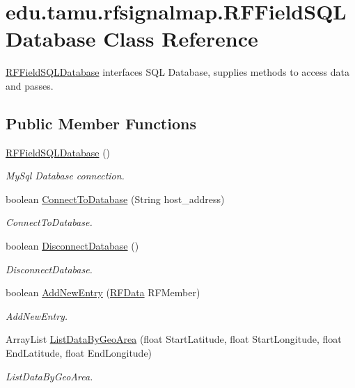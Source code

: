 \hypertarget{classedu_1_1tamu_1_1rfsignalmap_1_1_r_f_field_s_q_l_database}{}\section{edu.\+tamu.\+rfsignalmap.\+R\+F\+Field\+S\+Q\+L\+Database Class Reference}
\label{classedu_1_1tamu_1_1rfsignalmap_1_1_r_f_field_s_q_l_database}


\hyperlink{classedu_1_1tamu_1_1rfsignalmap_1_1_r_f_field_s_q_l_database}{R\+F\+Field\+S\+Q\+L\+Database} interfaces S\+QL Database, supplies methods to access data and passes.  


\subsection*{Public Member Functions}
\begin{DoxyCompactItemize}
\item 
\hyperlink{classedu_1_1tamu_1_1rfsignalmap_1_1_r_f_field_s_q_l_database_a3ec094dfb43ac20c47c9544f236c23f6}{R\+F\+Field\+S\+Q\+L\+Database} ()
\begin{DoxyCompactList}\small\item\em My\+Sql Database connection. \end{DoxyCompactList}\item 
boolean \hyperlink{classedu_1_1tamu_1_1rfsignalmap_1_1_r_f_field_s_q_l_database_a410c5236687fb8cdb8ae422f675a1149}{Connect\+To\+Database} (String host\+\_\+address)
\begin{DoxyCompactList}\small\item\em Connect\+To\+Database. \end{DoxyCompactList}\item 
boolean \hyperlink{classedu_1_1tamu_1_1rfsignalmap_1_1_r_f_field_s_q_l_database_a4144f9565e37492fe3f674821f89bea8}{Disconnect\+Database} ()
\begin{DoxyCompactList}\small\item\em Disconnect\+Database. \end{DoxyCompactList}\item 
boolean \hyperlink{classedu_1_1tamu_1_1rfsignalmap_1_1_r_f_field_s_q_l_database_ae74d741116f0f986f6f4a293b484b0f3}{Add\+New\+Entry} (\hyperlink{classedu_1_1tamu_1_1rfsignalmap_1_1_r_f_data}{R\+F\+Data} R\+F\+Member)
\begin{DoxyCompactList}\small\item\em Add\+New\+Entry. \end{DoxyCompactList}\item 
Array\+List \hyperlink{classedu_1_1tamu_1_1rfsignalmap_1_1_r_f_field_s_q_l_database_a0be5bce356ff7106cc96686e3946a2c3}{List\+Data\+By\+Geo\+Area} (float Start\+Latitude, float Start\+Longitude, float End\+Latitude, float End\+Longitude)
\begin{DoxyCompactList}\small\item\em List\+Data\+By\+Geo\+Area. \end{DoxyCompactList}\end{DoxyCompactItemize}


